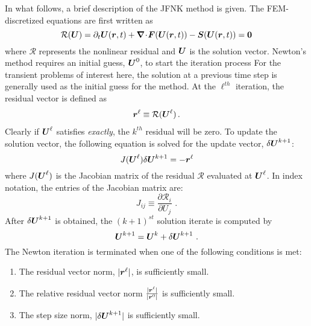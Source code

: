 In what follows, a brief description of the JFNK method is given.  The FEM-discretized equations are first written as
\begin{equation}
  \label{eqn:F}
  \mathcal{R} (\boldsymbol U) = \partial_t \boldsymbol U(\boldsymbol r, t) + \boldsymbol{\nabla}\! \cdot \! \boldsymbol F(\boldsymbol U(\boldsymbol r, t)) - \boldsymbol S(\boldsymbol U(\boldsymbol r, t)) = \boldsymbol0
\end{equation}
where $\mathcal{R}$ represents the nonlinear residual and $\boldsymbol U$
is the solution vector. Newton's method requires an initial guess,
$\boldsymbol U^0$, to start the iteration process For the transient
problems of interest here, the solution at a previous time step is
generally used as the initial guess for the method. At the $\ell^{th}$
iteration, the residual vector is defined as
\begin{align}
  \boldsymbol r^\ell \equiv \mathcal{R} (\boldsymbol U^\ell)\,.
\end{align}
Clearly if $\boldsymbol U^\ell$ satisfies  \emph{exactly}, the
$k^{th}$ residual will be zero.  To update the solution vector, the
following equation is solved for the update vector, $\delta
\boldsymbol U^{k+1}$:
\begin{equation}
  \label{eqn:newton_correction}
J (\boldsymbol U^\ell) \delta \boldsymbol U^{k+1} = - \boldsymbol r^\ell
\end{equation}
where $J(\boldsymbol U^\ell)$ is the Jacobian
matrix of the residual $\mathcal{R}$ evaluated at $\boldsymbol U^\ell$.  In index notation, the entries of the Jacobian matrix are:
\begin{equation}
  \label{eqn:jacobian_matrix}
  J_{ij} \equiv \frac {\partial \mathcal{R}_i} {\partial U_j} \,\,.
\end{equation}
After $\delta \boldsymbol U^{k+1}$ is obtained, the $(k+1)^{st}$ solution iterate
is computed by
\begin{equation}
  \boldsymbol U^{k+1} = \boldsymbol U^{k} + \delta \boldsymbol U^{k+1} \,\,.
\end{equation}
The Newton iteration is terminated when one of the following conditions is met:
\begin{enumerate}
\item The residual vector norm, $|\boldsymbol r^\ell|$, is sufficiently small.
\item The relative residual vector norm $\frac{|\boldsymbol r^\ell|}{|\boldsymbol r^0|}$  is sufficiently small.
\item The step size norm, $|\delta \boldsymbol U^{k+1}|$ is sufficiently small.
\end{enumerate}

